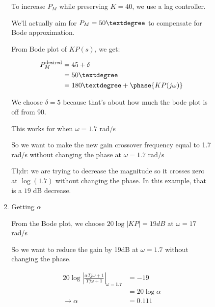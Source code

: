 \begin{enumerate}
\begin{enumerate}
\begin{itemize}
\begin{enumerate}
                                To increase $P_M$ while preserving $K = 40$, we use a lag controller.

                                We'll actually aim for $P_M = 50 \textdegree$ to compensate for Bode approximation.

                                From Bode plot of $KP(s)$, we get:

                                \begin{align*}
                                    P_M^{\text{desired}} &= 45 + \delta \\
                                    &= 50\textdegree \\
                                    &= 180 \textdegree + \phase{KP(j \omega)}
                                \end{align*}

                                We choose $\delta = 5$ \textdegree because that's about how much the bode plot is off from 90\textdegree.

                                This works for when $\omega = 1.7$ rad/s

                                So we want to make the new gain crossover frequency equal to 1.7 rad/s without changing the phase at $\omega = 1.7$ rad/s

                                Tl;dr: we are trying to decrease the magnitude so it crosses zero at $\log(1.7)$ without changing the phase. In this example, that is a $19$ dB decrease.

                            \item Getting $\alpha$

                                From the Bode plot, we choose $20\log|KP| = 19dB$ at $\omega  = 17$ rad/s

                                So we want to reduce the gain by 19dB at $\omega = 1.7$ without changing the phase.

                                \begin{align*}
                                    20 \log \left| \frac{\alpha T j \omega + 1}{T j \omega + 1} \right|_{\omega = 1.7} &= -19 \\
                                    &= 20 \log \alpha \\
                                    \rightarrow \alpha &= 0.111
                                \end{align*}


\end{enumerate}
\end{itemize}
\end{enumerate}
\end{enumerate}
